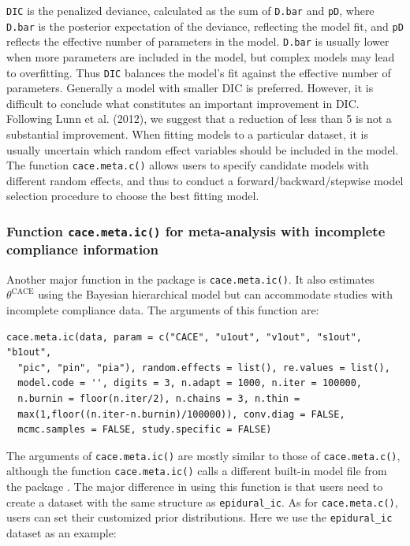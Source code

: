 \noindent \texttt{DIC} is the penalized deviance, calculated as the sum of \texttt{D.bar} and \texttt{pD}, where \texttt{D.bar} is the posterior expectation of the deviance, reflecting the model fit, and \texttt{pD} reflects the effective number of parameters in the model.
\texttt{D.bar} is usually lower when more parameters are included in the model, but complex models may lead to overfitting. Thus \texttt{DIC} balances the model's fit against the effective number of parameters.
Generally a model with smaller DIC is preferred. However, it is difficult to conclude what constitutes an important improvement in DIC. Following Lunn et al. (2012), we suggest that a reduction of less than 5 is not a substantial improvement.
When fitting models to a particular dataset, it is usually uncertain which random effect variables should be included in the model. The function \texttt{cace.meta.c()} allows users to specify candidate models with different random effects, and thus to conduct a forward/backward/stepwise model selection procedure to choose the best fitting model.

\hypertarget{function-cace.meta.ic-for-meta-analysis-with-incomplete-compliance-information}{%
\subsubsection{\texorpdfstring{Function \texttt{cace.meta.ic()} for meta-analysis with incomplete compliance information}{Function cace.meta.ic() for meta-analysis with incomplete compliance information}}\label{function-cace.meta.ic-for-meta-analysis-with-incomplete-compliance-information}}

Another major function in the package  is \texttt{cace.meta.ic()}. It also estimates \(\theta^\text{CACE}\) using the Bayesian hierarchical model but can accommodate studies with incomplete compliance data. The arguments of this function are:

\begin{verbatim}
cace.meta.ic(data, param = c("CACE", "u1out", "v1out", "s1out", "b1out", 
  "pic", "pin", "pia"), random.effects = list(), re.values = list(), 
  model.code = '', digits = 3, n.adapt = 1000, n.iter = 100000,
  n.burnin = floor(n.iter/2), n.chains = 3, n.thin = 
  max(1,floor((n.iter-n.burnin)/100000)), conv.diag = FALSE, 
  mcmc.samples = FALSE, study.specific = FALSE)
\end{verbatim}

\noindent The arguments of \texttt{cace.meta.ic()} are mostly similar to those of \texttt{cace.meta.c()}, although the function \texttt{cace.meta.ic()} calls a different built-in model file from the package . The major difference in using this function is that users need to create a dataset with the same structure as \texttt{epidural\_ic}. As for \texttt{cace.meta.c()}, users can set their customized prior distributions.
Here we use the \texttt{epidural\_ic} dataset as an example:

